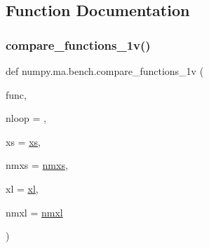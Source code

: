 \subsection{Function Documentation}
\mbox{\label{namespacenumpy_1_1ma_1_1bench_a3ab34b236186717774a6b480a6395b37}} 
\subsubsection{\texorpdfstring{compare\+\_\+functions\+\_\+1v()}{compare\_functions\_1v()}}
{\footnotesize\ttfamily def numpy.\+ma.\+bench.\+compare\+\_\+functions\+\_\+1v (\begin{DoxyParamCaption}\item[{}]{func,  }\item[{}]{nloop = {},  }\item[{}]{xs = {\ttfamily \hyperlink{namespacenumpy_1_1ma_1_1bench_abbf981f32817a2dc4ec6406bf324035a}{xs}},  }\item[{}]{nmxs = {\ttfamily \hyperlink{namespacenumpy_1_1ma_1_1bench_ade94ef9dc31fe069bf5d359e7280e523}{nmxs}},  }\item[{}]{xl = {\ttfamily \hyperlink{namespacenumpy_1_1ma_1_1bench_aa633d91568b1f05d8931d11d0732e618}{xl}},  }\item[{}]{nmxl = {\ttfamily \hyperlink{namespacenumpy_1_1ma_1_1bench_a8fcb5f226ee57f4211051c4f3103d7e7}{nmxl}} }\end{DoxyParamCaption})}

\mbox{\label{namespacenumpy_1_1ma_1_1bench_a1c1ab4f54cd6f6c17f7e4205eb1f3aa8}} 
